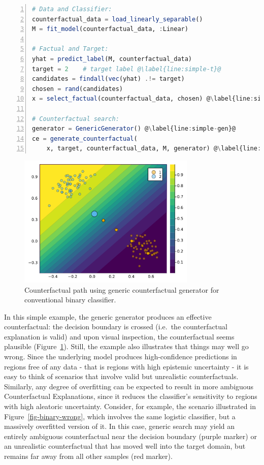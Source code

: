 \documentclass{juliacon}
\begin{document}
\begin{lstlisting}[language=Julia, escapechar=@, numbers=left, label={lst:simple}, caption={}] 
# Data and Classifier:
counterfactual_data = load_linearly_separable()
M = fit_model(counterfactual_data, :Linear)

# Factual and Target:
yhat = predict_label(M, counterfactual_data)
target = 2    # target label @\label{line:simple-t}@
candidates = findall(vec(yhat) .!= target)
chosen = rand(candidates)
x = select_factual(counterfactual_data, chosen) @\label{line:simple-x}@

# Counterfactual search:
generator = GenericGenerator() @\label{line:simple-gen}@
ce = generate_counterfactual(
    x, target, counterfactual_data, M, generator) @\label{line:simple-search}@
\end{lstlisting}

\begin{figure}

{\centering \includegraphics[width=3.33333in,height=2.5in]{www/ce_binary.png}

}

\caption{\label{fig-binary}Counterfactual path using generic
counterfactual generator for conventional binary classifier.}

\end{figure}

In this simple example, the generic generator produces an effective
counterfactual: the decision boundary is crossed (i.e.~the
counterfactual explanation is valid) and upon visual inspection, the
counterfactual seems plausible (Figure~\ref{fig-binary}). Still, the
example also illustrates that things may well go wrong. Since the
underlying model produces high-confidence predictions in regions free of
any data - that is regions with high epistemic uncertainty - it is easy
to think of scenarios that involve valid but unrealistic
counterfactuals. Similarly, any degree of overfitting can be expected to
result in more ambiguous Counterfactual Explanations, since it reduces
the classifier's sensitivity to regions with high aleatoric uncertainty.
Consider, for example, the scenario illustrated in
Figure~\ref{fig-binary-wrong}, which involves the same logistic
classifier, but a massively overfitted version of it. In this case,
generic search may yield an entirely ambiguous counterfactual near the
decision boundary (purple marker) or an unrealistic counterfactual that
has moved well into the target domain, but remains far away from all
other samples (red marker).
\end{document}
